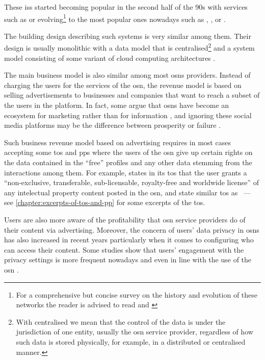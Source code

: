 \documentclass[showtrims, oldfontcommands]{kthesis}
\begin{document}
These \acp{is} started becoming popular in the second half of the 90s 
with services such as \LiveJournal or \Friendster evolving\footnote{For a comprehensive 
but concise survey on the history and evolution of these networks the reader is 
advised to read \cite{boydE07} and \cite{HeidemannKP12}} to the most popular ones 
nowadays such as \Facebook, \LinkedIn, \Twitter or \GooglePlus.

The building design describing such systems is very similar among them. Their design 
is usually monolithic with a data model that is centralised\footnote{With centralised 
we mean that the control of the data is under the jurisdiction of one entity, usually 
the \ac{osn} service provider, regardless of how such data is stored physically, 
for example, in a distributed or centralised manner.} and a system model consisting 
of some variant of cloud computing architectures \cite{PallisZD11}. 

The main business model is also similar among most \acp{osn} providers. Instead 
of charging the users for the services of the \ac{osn}, the revenue model is based 
on selling advertisements to businesses and companies that want to reach a subset 
of the users in the platform. In fact, some argue that \acp{osn} have become an 
ecosystem for marketing rather than for information \cite{HannaRC11}, and ignoring 
these social media platforms may be the difference between prosperity or failure 
\cite{HarrisR09}.

Such business revenue model based on advertising requires in most cases accepting 
some \ac{tos} and \acp{pp} where the users of the \ac{osn} give up certain rights 
on the data contained in the ``free'' profiles and any other data stemming from 
the interactions among them. For example, \Facebook states in its \ac{tos} that 
the user grants a ``non-exclusive, transferable, sub-licensable, royalty-free and 
worldwide license'' of any intelectual property content posted in the \ac{osn}, 
\LinkedIn and \Twitter state similar \ac{tos} as \Facebook~--- see \cref{chapter:excerpts-of-tos-and-pp} 
for some excerpts of the \ac{tos}.

Users are also more aware of the profitability that \ac{osn} service providers do 
of their content via advertising. Moreover, the concern of users' data privacy in 
\acp{osn} has also increased in recent years particularly when it comes to configuring 
who can access their content. Some studies show that users' engagement with the 
privacy settings is more frequent nowadays and even in line with the use of the 
\ac{osn} \cite{boydH10}.
\end{document}
